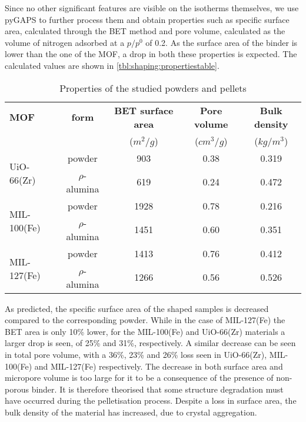 Since no other significant features are visible on the isotherms themselves,
we use pyGAPS to further process them and obtain properties
such as specific surface area, calculated through the \gls{BET} method and pore
volume, calculated as the volume of nitrogen
adsorbed at a \(p/p^0\) of 0.2.
As the surface area of the binder is lower than the
one of the \gls{MOF}, a drop in both these properties is expected.
The calculated values are shown in
\autoref{tbl:shaping:propertiestable}.

\begin{table}[htb]
	\centering
	\caption{Properties of the studied powders and pellets}
	\begin{tabular}{lcccc}
		\toprule
		\textbf{MOF}
		                             & \textbf{form}
		                             & \textbf{\gls{BET} surface area}
		                             & \textbf{Pore volume}
		                             & \textbf{Bulk density}                                                 \\
		                             &                           & (\(m^2/g\)) & (\(cm^3/g\)) & (\(kg/m^3\)) \\
		\midrule
		\multirow{2}{*}{UiO-66(Zr)}  & powder                    & 903         & 0.38         & 0.319        \\
		                             & \(\rho\)-alumina          & 619         & 0.24         & 0.472        \\
		\multirow{2}{*}{MIL-100(Fe)} & powder                    & 1928        & 0.78         & 0.216        \\
		                             & \(\rho\)-alumina          & 1451        & 0.60         & 0.351        \\
		\multirow{2}{*}{MIL-127(Fe)} & powder                    & 1413        & 0.76         & 0.412        \\
		                             & \(\rho\)-alumina          & 1266        & 0.56         & 0.526        \\
		\bottomrule
	\end{tabular}%
	\label{tbl:shaping:propertiestable}
\end{table}%

As predicted, the specific surface area of the shaped samples is
decreased compared to the corresponding powder. While in the case
of MIL-127(Fe) the \gls{BET} area is only 10\% lower, for the MIL-100(Fe)
and UiO-66(Zr) materials a larger drop is seen, of 25\% and 31\%,
respectively.
A similar decrease can be seen in total pore volume,
with a 36\%, 23\% and 26\% loss seen
in UiO-66(Zr), MIL-100(Fe) and MIL-127(Fe) respectively.
The decrease in both surface area and micropore volume is
too large for it to be a consequence of the presence of non-porous binder.
It is therefore theorised that some structure degradation must have
occurred during the pelletisation process.
Despite a loss in surface area, the bulk density of the material
has increased, due to crystal aggregation.